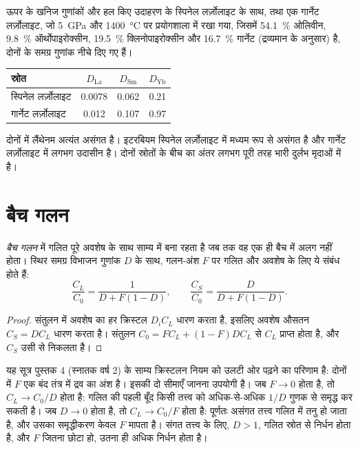 ऊपर के खनिज गुणांकों और हल किए उदाहरण के स्पिनेल लर्ज़ोलाइट के साथ, तथा
एक गार्नेट लर्ज़ोलाइट, जो \qty{5}{GPa} और
\qty{1400}{\celsius} पर प्रयोगशाला में रखा गया, जिसमें \qty{54.1}{\percent} ओलिवीन,
\qty{9.8}{\percent} ऑर्थोपाइरोक्सीन, \qty{19.5}{\percent} क्लिनोपाइरोक्सीन और
\qty{16.7}{\percent} गार्नेट (द्रव्यमान के अनुसार) है, दोनों के समग्र गुणांक नीचे दिए गए हैं।
\begin{center}
\small
\begin{tabular}{lccc}
\hline
स्रोत & $D_{\mathrm{La}}$ & $D_{\mathrm{Sm}}$ & $D_{\mathrm{Yb}}$ \\
\hline
स्पिनेल लर्ज़ोलाइट & 0.0078 & 0.062 & 0.21 \\
गार्नेट लर्ज़ोलाइट & 0.012 & 0.107 & 0.97 \\
\hline
\end{tabular}
\end{center}
दोनों में लैंथेनम अत्यंत असंगत है। इटरबियम स्पिनेल लर्ज़ोलाइट में मध्यम रूप से असंगत है
और गार्नेट लर्ज़ोलाइट में लगभग उदासीन है। दोनों
स्रोतों के बीच का अंतर लगभग पूरी तरह भारी दुर्लभ
मृदाओं में है।

\section{बैच गलन}\label{sec:b3:trace-element-modelling:batch}

\begin{theorem}[बैच गलन]\label{thm:b3:trace-element-modelling:batch}
\emph{बैच गलन} में गलित पूरे अवशेष के साथ साम्य में
बना रहता है जब तक वह एक ही बैच में अलग नहीं होता। स्थिर समग्र
विभाजन गुणांक $D$ के साथ, गलन-अंश $F$ पर गलित और अवशेष
के लिए ये संबंध होते हैं:
\[
\frac{C_L}{C_0} = \frac{1}{D + F(1 - D)}, \qquad
\frac{C_S}{C_0} = \frac{D}{D + F(1 - D)}.
\]
\end{theorem}

\begin{proof}
संतुलन में अवशेष का हर क्रिस्टल $D_iC_L$ धारण करता है, इसलिए अवशेष
औसतन $C_S = DC_L$ धारण करता है। संतुलन $C_0 = FC_L + (1 - F)DC_L$ से
$C_L$ प्राप्त होता है, और $C_S$ उसी से निकलता है।
\end{proof}

यह सूत्र पुस्तक 4 (स्नातक वर्ष 2) के साम्य क्रिस्टलन नियम को उलटी ओर
पढ़ने का परिणाम है: दोनों में $F$ एक बंद तंत्र में द्रव का अंश है। इसकी दो सीमाएँ जानना उपयोगी है।
जब $F \to 0$ होता है, तो $C_L \to C_0/D$ होता है: गलित की पहली बूँद
किसी तत्त्व को अधिक-से-अधिक $1/D$ गुणक से समृद्ध कर सकती है। जब $D \to 0$ होता है, तो $C_L \to
C_0/F$ होता है: पूर्णतः असंगत तत्त्व गलित में तनु हो जाता है, और उसका
समृद्धीकरण केवल $F$ मापता है। संगत तत्त्व के लिए, $D > 1$, गलित
स्रोत से निर्धन होता है, और $F$ जितना छोटा हो, उतना ही अधिक निर्धन होता है।

